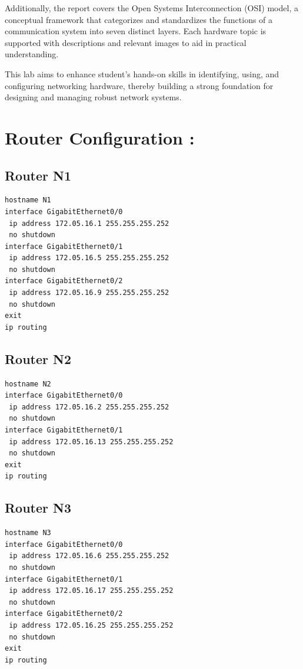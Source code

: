 \documentclass[12pt]{article}
\begin{document}
Additionally, the report covers the Open Systems Interconnection (OSI) model, a conceptual framework that categorizes and standardizes the functions of a communication system into seven distinct layers. Each hardware topic is supported with descriptions and relevant images to aid in practical understanding.

This lab aims to enhance student's hands-on skills in identifying, using, and configuring networking hardware, thereby building a strong foundation for designing and managing robust network systems.

\newpage

\section{Router Configuration :}

\subsection{Router N1}
\begin{lstlisting}[basicstyle=\ttfamily\small, frame=single]
hostname N1
interface GigabitEthernet0/0
 ip address 172.05.16.1 255.255.255.252
 no shutdown
interface GigabitEthernet0/1
 ip address 172.05.16.5 255.255.255.252
 no shutdown
interface GigabitEthernet0/2
 ip address 172.05.16.9 255.255.255.252
 no shutdown
exit
ip routing
\end{lstlisting}
\newpage
\subsection{Router N2}
\begin{lstlisting}[basicstyle=\ttfamily\small, frame=single]
hostname N2
interface GigabitEthernet0/0
 ip address 172.05.16.2 255.255.255.252
 no shutdown
interface GigabitEthernet0/1
 ip address 172.05.16.13 255.255.255.252
 no shutdown
exit
ip routing
\end{lstlisting}

\subsection{Router N3}
\begin{lstlisting}[basicstyle=\ttfamily\small, frame=single]
hostname N3
interface GigabitEthernet0/0
 ip address 172.05.16.6 255.255.255.252
 no shutdown
interface GigabitEthernet0/1
 ip address 172.05.16.17 255.255.255.252
 no shutdown
interface GigabitEthernet0/2
 ip address 172.05.16.25 255.255.255.252
 no shutdown
exit
ip routing
\end{lstlisting}
\end{document}
